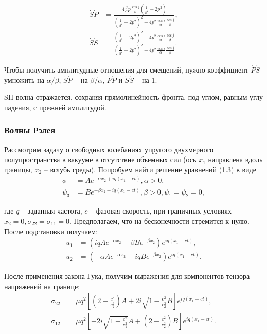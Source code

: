 \begin{align}
\acute{S}\grave{P} &= \frac{ 4\frac{\beta}{\alpha}p\frac{\cos{j}}{\beta}(\frac{1}{\beta^2} - 2p^2) }{ (\frac{1}{\beta^2} - 2p^2)^2 + 4p^2\frac{\cos{i}}{\alpha}\frac{\cos{j}}{\beta} }, \nonumber\\
\acute{S}\grave{S} &= \frac{ (\frac{1}{\beta^2} - 2p^2)^2 - 4p^2\frac{\cos{i}}{\alpha}\frac{\cos{j}}{\beta} }{ (\frac{1}{\beta^2} - 2p^2)^2 + 4p^2\frac{\cos{i}}{\alpha}\frac{\cos{j}}{\beta} }.
\end{align}

Чтобы получить амплитудные отношения для смещений, нужно коэффициент $\acute{P}\grave{S}$ умножить на $\alpha/\beta$, $\acute{S}\grave{P}$ -- на $\beta/\alpha$, $\acute{P}\grave{P}$ и $\acute{S}\grave{S}$ -- на 1.

SH-волна отражается, сохраняя прямолинейность фронта, под углом, равным углу падения, с прежней амплитудой.


\subsubsection{Волны Рэлея}

Рассмотрим задачу о свободных колебаниях упругого двухмерного полупространства в вакууме в отсутствие объемных сил \cite{lamb} (ось $x_1$ направлена вдоль границы, $x_2$ -- вглубь среды). Попробуем найти решение уравнений (1.3) в виде
\begin{align}
\phi &= Ae^{-\alpha x_2 + iq(x_1-ct)}, \alpha > 0, \nonumber\\
\psi_3 &= Be^{-\beta x_2 + iq(x_1-ct)}, \beta > 0, \psi_1 = \psi_2 = 0,
\end{align}

где $q$ -- заданная частота, $c$ -- фазовая скорость, при граничных условиях $x_2 = 0, \sigma_{22} = \sigma_{11} = 0$. Предполагаем, что на бесконечности стремится к нулю. После подстановки получаем:
\begin{align}
u_1 &= (iq Ae^{-\alpha x_2} - \beta Be^{-\beta x_2}) e^{iq(x_1-ct)}, \nonumber\\
u_2 &= (-\alpha Ae^{-\alpha x_2} - iq Be^{-\beta x_2}) e^{iq(x_1-ct)}.
\end{align}

После применения закона Гука, получим выражения для компонентов тензора напряжений на границе:
\begin{align}
\sigma_{22} &= \mu q^2 [ (2-\frac{c^2}{c_2^2})A + 2i\sqrt{1-\frac{c^2}{c_2^2}}B ] e^{iq(x_1-ct)}, \nonumber\\
\sigma_{12} &= \mu q^2 [ -2i\sqrt{1-\frac{c^2}{c_1^2}}A + (2-\frac{c^2}{c_2^2})B ] e^{iq(x_1-ct)}.
\end{align}

